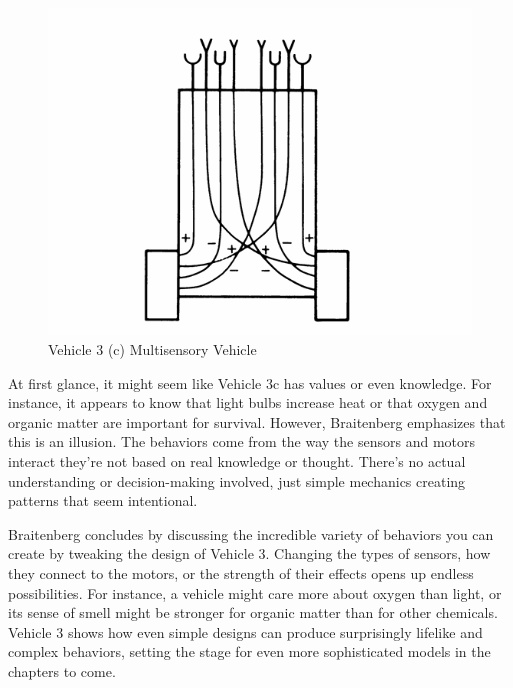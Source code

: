 \documentclass{article}
\begin{document}
    \begin{figure}[h]
		\centering
		\includegraphics[scale=0.5]{images/Vehicle_3c.png}
		\caption{Vehicle 3 (c) Multisensory Vehicle }
		\label{fig:vehicle-3c}
	\end{figure}

    At first glance, it might seem like Vehicle 3c has values or even knowledge. For instance, it appears to know that light bulbs increase heat or that oxygen and organic matter are important for survival. However, Braitenberg emphasizes that this is an illusion. The behaviors come from the way the sensors and motors interact they're not based on real knowledge or thought. There's no actual understanding or decision-making involved, just simple mechanics creating patterns that seem intentional.

    Braitenberg concludes by discussing the incredible variety of behaviors you can create by tweaking the design of Vehicle 3. Changing the types of sensors, how they connect to the motors, or the strength of their effects opens up endless possibilities. For instance, a vehicle might care more about oxygen than light, or its sense of smell might be stronger for organic matter than for other chemicals. Vehicle 3 shows how even simple designs can produce surprisingly lifelike and complex behaviors, setting the stage for even more sophisticated models in the chapters to come.
\end{document}
